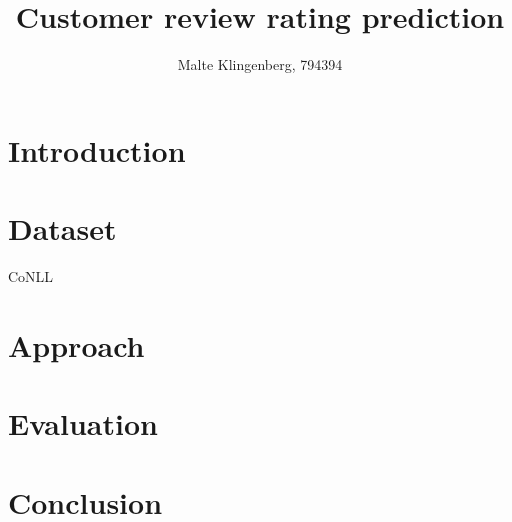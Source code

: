 \documentclass[10pt,notitlepage]{scrartcl}
\author{Malte Klingenberg, 794394}
\title{Customer review rating prediction}
\date{}
\begin{document}
\maketitle

\section*{Introduction}

\section*{Dataset}
CoNLL \cite{xue2016conll}
\section*{Approach}

\section*{Evaluation}

\section*{Conclusion}


\pagebreak


\end{document}
